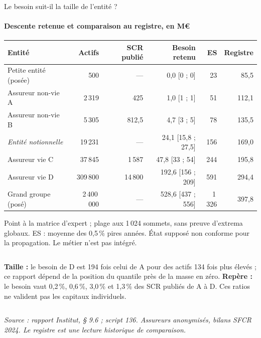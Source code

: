 \documentclass[aspectratio=169,10pt,t]{beamer}
\newcommand{\source}[1]{\par\vfill{\tiny\color{gris}\textit{Source : #1}}\par\vspace{-1mm}}
\renewcommand{\arraystretch}{1.25}
\begin{document}
\begin{frame}{Le besoin suit-il la taille de l'entité ?}
  \framesubtitle{\ajout Descente retenue et comparaison au registre, en M€}
  \scriptsize
  \renewcommand{\arraystretch}{1.12}
  \setlength{\tabcolsep}{4pt}
  \begin{tabularx}{\linewidth}{@{}Y r r r r r@{}}
    \toprule
    Entité & Actifs & SCR publié & Besoin retenu & ES & Registre \\
    \midrule
    Petite entité (posée) & 500 & --- & 0,0 [0 ; 0] & 23 & 85,5 \\
    Assureur non-vie A & 2\,319 & 425 & 1,0 [1 ; 1] & 51 & 112,1 \\
    Assureur non-vie B & 5\,305 & 812,5 & 4,7 [3 ; 5] & 78 & 135,5 \\
    \textit{Entité notionnelle} & 19\,231 & --- & 24,1 [15,8 ; 27,5] & 156 & 169,0 \\
    Assureur vie C & 37\,845 & 1\,587 & 47,8 [33 ; 54] & 244 & 195,8 \\
    Assureur vie D & 309\,800 & 14\,800 & 192,6 [156 ; 209] & 591 & 294,4 \\
    Grand groupe (posé) & 2\,400\,000 & --- & 528,6 [437 ; 556] & 1\,326 & 397,8 \\
    \bottomrule
  \end{tabularx}\par\vspace{1mm}
  {\tiny Point à la matrice d'expert ; plage aux 1\,024 sommets, sans preuve d'extrema globaux. ES : moyenne des 0,5\,\% pires années. État supposé non conforme pour la propagation. Le métier n'est pas intégré.\par}\vspace{1.5mm}
  \begin{columns}[T,onlytextwidth]
    \scriptsize
    \textbf{Taille :} le besoin de D est 194 fois celui de A pour des actifs 134 fois plus élevés ; ce rapport dépend de la position du quantile près de la masse en zéro.
    \scriptsize
    \textbf{Repère :} le besoin vaut 0,2\,\%, 0,6\,\%, 3,0\,\% et 1,3\,\% des SCR publiés de A à D. Ces ratios ne valident pas les capitaux individuels.
  \end{columns}
  \source{rapport Institut, § 9.6 ; script 136. Assureurs anonymisés, bilans SFCR 2024. Le registre est une lecture historique de comparaison.}
\end{frame}
\end{document}
